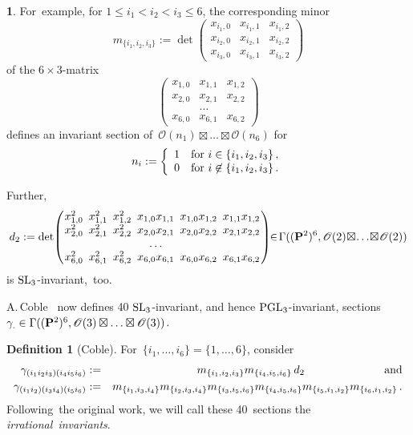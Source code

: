 \documentclass[reqno]{amsart}
\theoremstyle{definition}
\newtheorem{ttt}[theorem]{}
\newtheorem{defio}[theorem]{Definition}
\theoremstyle{remark}
\numberwithin{equation}{section}
\newcommand{\calO}{\mathscr{O}}
\newcommand{\SL}{\mathop{\rm SL}\nolimits}
\newcommand{\PGL}{\mathop{\rm PGL}\nolimits}
\newcommand{\bP}{{\bf P}}
\begin{document}
\begin{ttt}\smallskip
For~example, for
$1 \leq i_1 < i_2 < i_3 \leq 6$,
the corresponding minor
$$m_{\{i_1,i_2,i_3\}} := \det
\left(
\begin{array}{ccc}
x_{i_1,0} & x_{i_1,1} & x_{i_1,2} \\
x_{i_2,0} & x_{i_2,1} & x_{i_2,2} \\
x_{i_3,0} & x_{i_3,1} & x_{i_3,2}
\end{array}
\right)
$$
of the
$6 \times 3$-matrix
$$
\left(
\begin{array}{ccc}
x_{1,0} & x_{1,1} & x_{1,2} \\
x_{2,0} & x_{2,1} & x_{2,2} \\
        & \ldots  &         \\
x_{6,0} & x_{6,1} & x_{6,2}
\end{array}
\right)
$$
defines an invariant section
of~$\calO(n_1) \boxtimes \ldots \boxtimes \calO(n_6)$
for
$$n_i :=
\left\{
\begin{array}{cc}
1 & {\rm for~} i \in \{i_1,i_2,i_3\}\, , \\
0 & {\rm for~} i \not\in \{i_1,i_2,i_3\}\, .
\end{array}
\right.$$

Further,
$$
{
\arraycolsep2.5pt
d_2 := \det\!
\left(\!
\begin{array}{cccccc}
x_{1,0}^2 & x_{1,1}^2 & x_{1,2}^2 & x_{1,0}x_{1,1} & x_{1,0}x_{1,2} & x_{1,1}x_{1,2} \\
x_{2,0}^2 & x_{2,1}^2 & x_{2,2}^2 & x_{2,0}x_{2,1} & x_{2,0}x_{2,2} & x_{2,1}x_{2,2} \\
          &           &           & \ldots         &                &                \\
x_{6,0}^2 & x_{6,1}^2 & x_{6,2}^2 & x_{6,0}x_{6,1} & x_{6,0}x_{6,2} & x_{6,1}x_{6,2}
\end{array}
\!\right)
\!\!\in\! \Gamma((\bP^2)^6, \calO(2) \!\boxtimes\! \ldots \!\boxtimes\! \calO(2))
}
$$
is
\mbox{$\SL_3$-invariant},~too.

A.\,Coble~\cite[formulas (16) and~(18)]{Co3} now defines 40
\mbox{$\SL_3$-invariant},
and hence
\mbox{$\PGL_3$-invariant},
sections
$\gamma_. \in \Gamma((\bP^2)^6, \calO(3) \boxtimes \ldots \boxtimes \calO(3))$.
\end{ttt}

\begin{defio}[{\rm Coble}{}]\smallskip
For~$\{i_1, \ldots, i_6\} = \{1, \ldots, 6\}$,
consider
\begin{eqnarray*}
\gamma_{(i_1i_2i_3)(i_4i_5i_6)} & := & m_{\{i_1,i_2,i_3\}} m_{\{i_4,i_5,i_6\}} \,d_2 \hspace{2.5cm} {\rm and} \\
\gamma_{(i_1i_2)(i_3i_4)(i_5i_6)} & := & m_{\{i_1,i_3,i_4\}} m_{\{i_2,i_3,i_4\}} m_{\{i_3,i_5,i_6\}} m_{\{i_4,i_5,i_6\}} m_{\{i_5,i_1,i_2\}} m_{\{i_6,i_1,i_2\}} \, .
\end{eqnarray*}
Following~the original work, we will call these 40~sections the {\em irrational~invariants}.
\end{defio}
\end{document}
